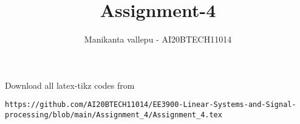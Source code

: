 \documentclass[journal,12pt,twocolumn]{IEEEtran}
\DeclareMathOperator*{\Res}{Res}
\begin{document}
\newcommand{\BEQA}{\begin{eqnarray}}
\newcommand{\EEQA}{\end{eqnarray}}
\newcommand{\define}{\stackrel{\triangle}{=}}

\raggedbottom
\setlength{\parindent}{0pt}
\providecommand{\mbf}{\mathbf}
\providecommand{\pr}[1]{\ensuremath{\Pr\left(#1\right)}}
\providecommand{\qfunc}[1]{\ensuremath{Q\left(#1\right)}}
\providecommand{\sbrak}[1]{\ensuremath{{}\left[#1\right]}}
\providecommand{\lsbrak}[1]{\ensuremath{{}\left[#1\right.}}
\providecommand{\rsbrak}[1]{\ensuremath{{}\left.#1\right]}}
\providecommand{\brak}[1]{\ensuremath{\left(#1\right)}}
\providecommand{\lbrak}[1]{\ensuremath{\left(#1\right.}}
\providecommand{\rbrak}[1]{\ensuremath{\left.#1\right)}}
\providecommand{\cbrak}[1]{\ensuremath{\left\{#1\right\}}}
\providecommand{\lcbrak}[1]{\ensuremath{\left\{#1\right.}}
\providecommand{\rcbrak}[1]{\ensuremath{\left.#1\right\}}}
\theoremstyle{remark}
\newtheorem{rem}{Remark}
\newcommand{\sgn}{\mathop{\mathrm{sgn}}}
\providecommand{\abs}[1]{\vert#1\vert}
\providecommand{\res}[1]{\Res\displaylimits_{#1}} 
\providecommand{\norm}[1]{\lVert#1\rVert}
\providecommand{\mtx}[1]{\mathbf{#1}}
\providecommand{\mean}[1]{E[ #1 ]}
\providecommand{\fourier}{\overset{\mathcal{F}}{ \rightleftharpoons}}
\providecommand{\system}{\overset{\mathcal{H}}{ \longleftrightarrow}}
\newcommand{\solution}{\noindent \textbf{Solution: }}
\newcommand{\cosec}{\,\text{cosec}\,}
\providecommand{\dec}[2]{\ensuremath{\overset{#1}{\underset{#2}{\gtrless}}}}
\newcommand{\myvec}[1]{\ensuremath{\begin{pmatrix}#1\end{pmatrix}}}
\newcommand{\mydet}[1]{\ensuremath{\begin{vmatrix}#1\end{vmatrix}}}
\makeatletter
{}
\makeatother
\let\StandardTheFigure\thefigure
\let\vec\mathbf
\renewcommand{\thefigure}{\theproblem}
\def\putbox#1#2#3{\makebox[0in][l]{\makebox[#1][l]{}\raisebox{\baselineskip}[0in][0in]{\raisebox{#2}[0in][0in]{#3}}}}
     \def\rightbox#1{\makebox[0in][r]{#1}}
     \def\centbox#1{\makebox[0in]{#1}}
     \def\topbox#1{\raisebox{-\baselineskip}[0in][0in]{#1}}
     \def\midbox#1{\raisebox{-0.5\baselineskip}[0in][0in]{#1}}
\vspace{3cm}
\title{ Assignment-4}
\author{Manikanta vallepu - AI20BTECH11014}
\maketitle
\newpage
\bigskip
\renewcommand{\thefigure}{\theenumi}
\renewcommand{\thetable}{\theenumi}
\newcommand{\R}{\mathbb{R}}
Download all  latex-tikz codes from 
\begin{lstlisting}
https://github.com/AI20BTECH11014/EE3900-Linear-Systems-and-Signal-processing/blob/main/Assignment_4/Assignment_4.tex
\end{lstlisting}
\vspace{0.5cm}
\end{document}
